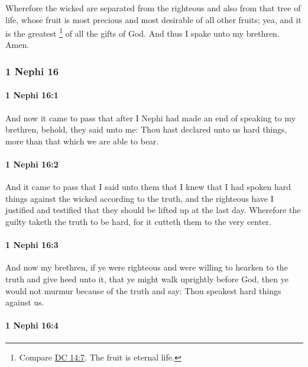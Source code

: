 			Wherefore the wicked are separated from the righteous
			and also from that tree of life,
			whose fruit is most precious and most desirable of all other fruits;
			yea, and it is the greatest%
				\footnote{%
					Compare \hyperref[DC14-7]{DC 14:7}. The fruit is eternal life.
					}
			of all the gifts of God.
			And thus I spake unto my brethren.
			Amen.

	\subsubsection{1 Nephi 16} %
		\label{1NEPHI-16}
		
		\paragraph{1 Nephi 16:1} %
			\label{1NEPHI-16-1}

			And now it came to pass that
			after I Nephi had made an end of speaking to my brethren,
			behold, they said unto me:
			Thou hast declared unto us hard things,
			more than that which we are able to bear.

		\paragraph{1 Nephi 16:2} %
			\label{1NEPHI-16-2}

			And it came to pass that I said unto them
			that I knew that I had spoken hard things against the wicked
			according to the truth,
			and the righteous have I justified
			and testified that they should be lifted up at the last day.
			Wherefore the guilty taketh the truth to be hard,
			for it cutteth them to the very center.

		\paragraph{1 Nephi 16:3} %
			\label{1NEPHI-16-3}

			And now my brethren, if ye were righteous
			and were willing to hearken to the truth and give heed unto it,
			that ye might walk uprightly before God,
			then ye would not murmur because of the truth and say:
			Thou speakest hard things against us.

		\paragraph{1 Nephi 16:4} %
			\label{1NEPHI-16-4}

